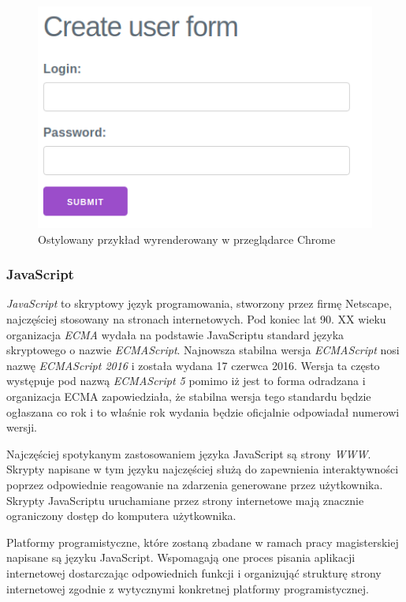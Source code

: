 \documentclass[polish, twoside, 12pt]{mwart}
\begin{document}
\begin{figure}[ht]
  \includegraphics[width=\textwidth]{html-css-chrome.png}
	\caption{Ostylowany przykład wyrenderowany w przeglądarce Chrome}
\end{figure}

\subsubsection{JavaScript}

\emph{JavaScript} to skryptowy język programowania, stworzony przez firmę Netscape, najczęściej stosowany na stronach internetowych. Pod koniec lat 90. XX wieku organizacja \emph{ECMA} wydała na podstawie JavaScriptu standard języka skryptowego o nazwie \emph{ECMAScript}. Najnowsza stabilna wersja \emph{ECMAScript} nosi nazwę \emph{ECMAScript 2016} \cite{es2016} i została wydana 17 czerwca 2016. Wersja ta często występuje pod nazwą \emph{ECMAScript 5} pomimo iż jest to forma odradzana i organizacja ECMA zapowiedziała, że stabilna wersja tego standardu będzie ogłaszana co rok i to właśnie rok wydania będzie oficjalnie odpowiadał numerowi wersji. 

Najczęściej spotykanym zastosowaniem języka JavaScript są strony \emph{WWW}. Skrypty napisane w tym języku najczęściej służą do zapewnienia interaktywności poprzez odpowiednie reagowanie na zdarzenia generowane przez użytkownika. Skrypty JavaScriptu uruchamiane przez strony internetowe mają znacznie ograniczony dostęp do komputera użytkownika. 

Platformy programistyczne, które zostaną zbadane w ramach pracy magisterskiej napisane są języku JavaScript. Wspomagają one proces pisania aplikacji internetowej dostarczając odpowiednich funkcji i organizująć strukturę strony internetowej zgodnie z wytycznymi konkretnej platformy programistycznej.
\end{document}
